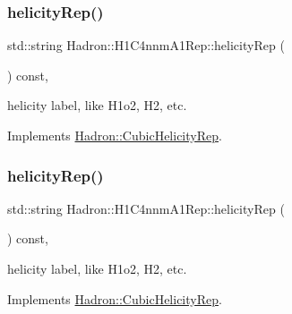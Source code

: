 \mbox{\label{structHadron_1_1H1C4nnmA1Rep_a1ef14b37ee0380d3c1dbc261b412772d}} 
\subsubsection{\texorpdfstring{helicityRep()}{helicityRep()}\hspace{0.1cm}{\footnotesize\ttfamily [1/2]}}
{\footnotesize\ttfamily std\+::string Hadron\+::\+H1\+C4nnm\+A1\+Rep\+::helicity\+Rep (\begin{DoxyParamCaption}{ }\end{DoxyParamCaption}) const\hspace{0.3cm}{\ttfamily [inline]}, {\ttfamily [virtual]}}

helicity label, like H1o2, H2, etc. 

Implements \mbox{\hyperlink{structHadron_1_1CubicHelicityRep_af1096946b7470edf0a55451cc662f231}{Hadron\+::\+Cubic\+Helicity\+Rep}}.

\mbox{\label{structHadron_1_1H1C4nnmA1Rep_a1ef14b37ee0380d3c1dbc261b412772d}} 
\subsubsection{\texorpdfstring{helicityRep()}{helicityRep()}\hspace{0.1cm}{\footnotesize\ttfamily [2/2]}}
{\footnotesize\ttfamily std\+::string Hadron\+::\+H1\+C4nnm\+A1\+Rep\+::helicity\+Rep (\begin{DoxyParamCaption}{ }\end{DoxyParamCaption}) const\hspace{0.3cm}{\ttfamily [inline]}, {\ttfamily [virtual]}}

helicity label, like H1o2, H2, etc. 

Implements \mbox{\hyperlink{structHadron_1_1CubicHelicityRep_af1096946b7470edf0a55451cc662f231}{Hadron\+::\+Cubic\+Helicity\+Rep}}.

\mbox{\label{structHadron_1_1H1C4nnmA1Rep_a66b6495d208ea091b2e8b5e45bf67c29}} 
